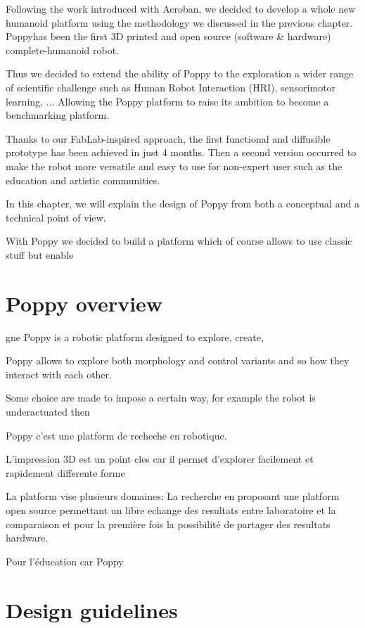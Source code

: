 Following the work introduced with Acroban, we decided to develop a whole new humanoid platform using the methodology we discussed in the previous chapter. Poppy\texttrademark has been the first 3D printed and open source (software \& hardware) complete-humanoid robot.


Thus we decided to extend the ability of Poppy to the exploration a wider range of scientific challenge such as Human Robot Interaction (HRI), sensorimotor learning, ...
Allowing the Poppy platform to raise its ambition to become a benchmarking platform.

Thanks to our FabLab-inspired approach, the first functional and diffusible prototype has been achieved in just 4 months.
Then a second version occurred to make the robot more versatile and easy to use for non-expert user such as the education and artistic communities.

In this chapter, we will explain the design of Poppy from both a conceptual and a technical point of view.

With Poppy we decided to build a platform which of course allows to use classic stuff but enable


\section{Poppy overview} %



gne
Poppy is a robotic platform designed to explore, create,

Poppy allows to explore both morphology and control variants and so how they interact with each other.

Some choice are made to impose a certain way, for example the robot is underactuated then

Poppy c'est une platform de recheche en robotique.

L'impression 3D est un point cles car il permet d'explorer facilement et rapidement differente forme

La platform vise plusieurs domaines:
La recherche en proposant une platform open source permettant un libre echange des resultats entre laboratoire et la comparaison
et pour la première fois la possibilité de partager des resultats hardware.

Pour l'éducation car Poppy


\section{Design guidelines} %

